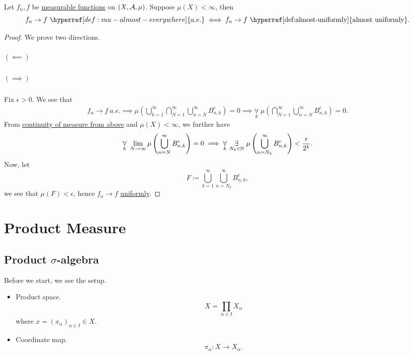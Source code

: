\begin{theorem}\label{thm:Egorov-theorem}
	Let \(f_{n}, f\) be \hyperref[def:measurable-function]{measurable functions} on \((X, \mathcal{\MakeUppercase{a}} , \mu )\). Suppose \(\mu (X)<\infty \), then
	\[
		f_{n}\to f\ \hyperref[def:mu-almost-everywhere]{a.e.} \iff f_{n}\to f\text{ \hyperref[def:almost-uniformly]{almost uniformly}}.
	\]
\end{theorem}
\begin{proof}
	We prove two directions.
	\paragraph{\((\impliedby)\)}

	\paragraph{\((\implies )\)}
	Fix \(\epsilon > 0\). We see that
	\[
		\begin{split}
			f_{n}\to f\ \hyperref[def:mu-almost-everywhere]{a.e.}
			\implies \mu \left(\bigcup\limits_{k=1}^{\infty} \bigcap\limits_{N=1}^{\infty} \bigcup\limits_{n=N}^{\infty} B_{n, k}^{c} \right) = 0
			\implies \underset{k}{\forall}\ \mu \left(\bigcap\limits_{N=1}^{\infty} \bigcup\limits_{n=N}^{\infty} B_{n, k}^{c} \right) = 0.
		\end{split}
	\]
	From \hyperref[thm:measure-space-continuity-from-above]{continuity of measure from above} and \(\mu (X)<\infty \), we further have
	\[
		\underset{k}{\forall}\ \lim\limits_{N \to \infty} \mu \left(\bigcup\limits_{n=N}^{\infty} B_{n, k}^{c} \right) = 0 \implies \underset{k}{\forall}\ \underset{ N_{k}\in\mathbb{\MakeUppercase{n}}}{\exists}\ \mu \left(\bigcup\limits_{n=N_{k}}^{\infty} B_{n, k}^{c} \right)< \frac{\epsilon}{2^k}.
	\]
	Now, let
	\[
		F \coloneqq \bigcup\limits_{k=1}^{\infty} \bigcup\limits_{n=N_{k}}^{\infty} B_{n, k}^{c} ,
	\]
	we see that \(\mu (F) < \epsilon \), hence \(f_{n}\to f\) \hyperref[def:uniformly-convergence]{uniformly}.
\end{proof}

\chapter{Product Measure}\label{ch:Product-Measure}
\section{Product \(\sigma\)-algebra}
Before we start, we see the setup.
\begin{itemize}
	\item Product space.
	      \[
		      X = \prod\limits_{\alpha \in I} X_\alpha
	      \]
	      where \(x = (x_\alpha )_{\alpha \in I}\in X\).
	\item Coordinate map.
	      \[
		      \pi _\alpha \colon X\to X_\alpha.
	      \]
\end{itemize}

